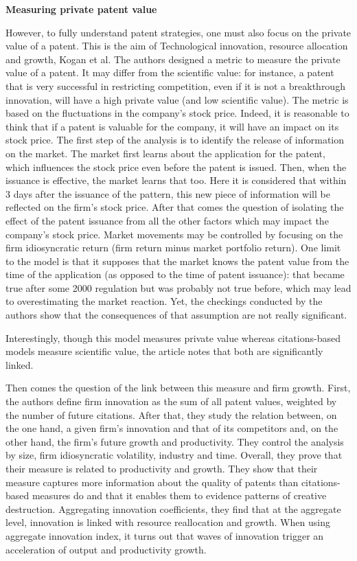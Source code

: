 \documentclass[12pt]{article}
\begin{document}
\textbf{Measuring private patent value}

However, to fully understand patent strategies, one must also focus on the private value of a patent. This is the aim of Technological innovation, resource allocation and growth, Kogan et al. The authors designed a metric to measure the private value of a patent. It may differ from the scientific value: for instance, a patent that is very successful in restricting competition, even if it is not a breakthrough innovation, will have a high private value (and low scientific value). The metric is based on the fluctuations in the company’s stock price. Indeed, it is reasonable to think that if a patent is valuable for the company, it will have an impact on its stock price. The first step of the analysis is to identify the release of information on the market. The market first learns about the application for the patent, which influences the stock price even before the patent is issued. Then, when the issuance is effective, the market learns that too. Here it is considered that within 3 days after the issuance of the pattern, this new piece of information will be reflected on the firm’s stock price. After that comes the question of isolating the effect of the patent issuance from all the other factors which may impact the company's stock price. Market movements may be controlled by focusing on the firm idiosyncratic return (firm return minus market portfolio return). One limit to the model is that it supposes that the market knows the patent value from the time of the application (as opposed to the time of patent issuance): that became true after some 2000 regulation but was probably not true before, which may lead to overestimating the market reaction. Yet, the checkings conducted by the authors show that the consequences of that assumption are not really significant. 

Interestingly, though this model measures private value whereas citations-based models measure scientific value, the article notes that both are significantly linked.

Then comes the question of the link between this measure and firm growth. First, the authors define firm innovation as the sum of all patent values, weighted by the number of future citations. After that, they study the relation between, on the one hand, a given firm's innovation and that of its competitors and, on the other hand, the firm's future growth and productivity. They control the analysis by size, firm idiosyncratic volatility, industry and time. Overall, they prove that their measure is related to productivity and growth. They show that their measure captures more information about the quality of patents than citations-based measures do and that it enables them to evidence patterns of creative destruction. Aggregating innovation coefficients, they find that at the aggregate level, innovation is linked with resource reallocation and growth. When using aggregate innovation index, it turns out that waves of innovation trigger an acceleration of output and productivity growth.
\end{document}
